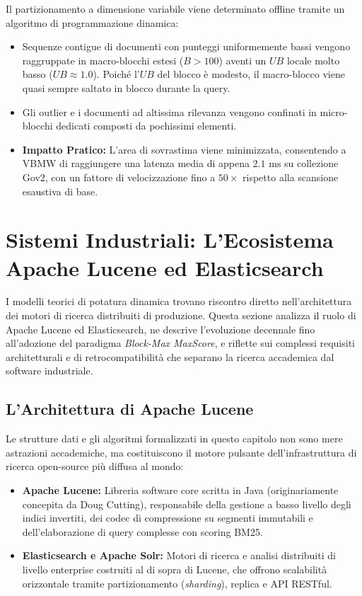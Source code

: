 Il partizionamento a dimensione variabile viene determinato offline tramite un algoritmo di programmazione dinamica:
\begin{itemize}
    \item Sequenze contigue di documenti con punteggi uniformemente bassi vengono raggruppate in macro-blocchi estesi ($B > 100$) aventi un $UB$ locale molto basso ($UB \approx 1.0$). Poich\'e l'$UB$ del blocco \`e modesto, il macro-blocco viene quasi sempre saltato in blocco durante la query.
    \item Gli outlier e i documenti ad altissima rilevanza vengono confinati in micro-blocchi dedicati composti da pochissimi elementi.
    \item \textbf{Impatto Pratico:} L'area di sovrastima viene minimizzata, consentendo a VBMW di raggiungere una latenza media di appena \textbf{$2.1\text{ ms}$} su collezione Gov2, con un fattore di velocizzazione fino a $50\times$ rispetto alla scansione esaustiva di base.
\end{itemize}

\FloatBarrier
\section{Sistemi Industriali: L'Ecosistema Apache Lucene ed Elasticsearch}
\label{sec:lucene-industriale}

I modelli teorici di potatura dinamica trovano riscontro diretto nell'architettura dei motori di ricerca distribuiti di produzione. Questa sezione analizza il ruolo di Apache Lucene ed Elasticsearch, ne descrive l'evoluzione decennale fino all'adozione del paradigma \textit{Block-Max MaxScore}, e riflette sui complessi requisiti architetturali e di retrocompatibilit\`a che separano la ricerca accademica dal software industriale.

\FloatBarrier
\subsection{L'Architettura di Apache Lucene}
\label{subsec:architettura-apache-lucene}
Le strutture dati e gli algoritmi formalizzati in questo capitolo non sono mere astrazioni accademiche, ma costituiscono il motore pulsante dell'infrastruttura di ricerca open-source pi\`u diffusa al mondo:
\begin{itemize}
    \item \textbf{Apache Lucene:} Libreria software core scritta in Java (originariamente concepita da Doug Cutting), responsabile della gestione a basso livello degli indici invertiti, dei codec di compressione su segmenti immutabili e dell'elaborazione di query complesse con scoring BM25.
    \item \textbf{Elasticsearch e Apache Solr:} Motori di ricerca e analisi distribuiti di livello enterprise costruiti al di sopra di Lucene, che offrono scalabilit\`a orizzontale tramite partizionamento (\textit{sharding}), replica e API RESTful.
\end{itemize}

